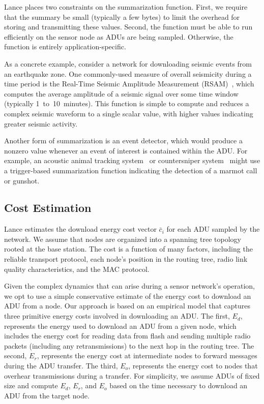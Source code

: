 Lance places two constraints on the summarization function. First, we require
that the summary be small (typically a few bytes) to limit the overhead for
storing and transmitting these values. Second, the function must be able to
run efficiently on the sensor node as ADUs are being sampled. Otherwise, the
function is entirely application-specific.

As a concrete example, consider a network for downloading seismic events from
an earthquake zone. One commonly-used measure of overall seismicity during a
time period is the Real-Time Seismic Amplitude Measurement
(RSAM)~\cite{rsam}, which computes the average amplitude of a seismic signal
over some time window (typically 1~to~10~minutes). This function is simple to
compute and reduces a complex seismic waveform to a single scalar value, with
higher values indicating greater seismic activity.

Another form of summarization is an event detector, which would produce a
nonzero value whenever an event of interest is contained within the ADU. For
example, an acoustic animal tracking system~\cite{girod-ipsn07} or
countersniper system~\cite{shooter-localization} might use a trigger-based
summarization function indicating the detection of a marmot call or gunshot.

\subsection{Cost Estimation}
\label{lance-subsec-costestimation}

Lance estimates the download energy cost vector $\bar{c}_i$ for each ADU
sampled by the network. We assume that nodes are organized into a spanning
tree topology rooted at the base station. The cost is a function of many
factors, including the reliable transport protocol, each node's position in
the routing tree, radio link quality characteristics, and the MAC protocol.

Given the complex dynamics that can arise during a sensor network's
operation, we opt to use a simple conservative estimate of the energy cost to
download an ADU from a node. Our approach is based on an empirical model that
captures three primitive energy costs involved in downloading an ADU. The
first, $E_d$, represents the energy used to download an ADU from a given
node, which includes the energy cost for reading data from flash and sending
multiple radio packets (including any retransmissions) to the next hop in the
routing tree. The second, $E_r$, represents the energy cost at intermediate
nodes to forward messages during the ADU transfer. The third, $E_o$,
represents the energy cost to nodes that overhear transmissions during a
transfer. For simplicity, we assume ADUs of fixed size and compute $E_d$,
$E_r$, and $E_o$ based on the time necessary to download an ADU from the
target node.

